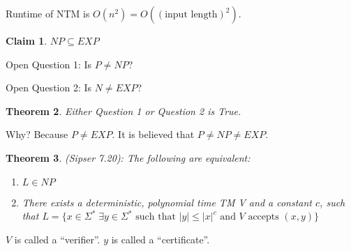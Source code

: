 \documentclass[twoside]{article}
\newcounter{lecnum}
\newtheorem{theorem}{Theorem}[lecnum]
\newtheorem{claim}[theorem]{Claim}
\newcommand{\abs}[1]{\left | #1 \right |}
\begin{document}
Runtime of NTM is $O(n^2) = O((\text{input length})^2)$.

\begin{claim}
  $NP \subseteq EXP$
\end{claim}

Open Question 1: Is $P \neq NP$?

Open Question 2: Is $N \neq EXP$?

\begin{theorem}
  Either Question 1 or Question 2 is True.
\end{theorem}

Why? Because $P \neq EXP$. It is believed that $P \neq NP \neq EXP$.

\begin{theorem}
  (Sipser 7.20): The following are equivalent:
  \begin{enumerate}
    \item $L \in NP$
    \item There exists a deterministic, polynomial time TM V and a constant $c$, such that $L = \{x \in \Sigma^* \; \exists y \in \Sigma^* \text{ such that } \abs{y} \leq \abs{x}^c \text{ and } V \text{ accepts } (x, y)\}$
  \end{enumerate}
\end{theorem}

$V$ is called a ``verifier''. $y$ is called a ``certificate''. 
\end{document}
